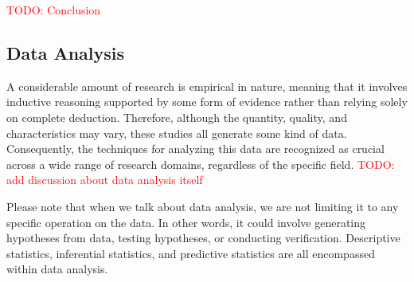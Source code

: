 \documentclass{book}
\begin{document}
\textcolor{red}{TODO: Conclusion}






\subsection{Data Analysis}
A considerable amount of research is empirical in nature, meaning that it involves inductive reasoning supported by some form of evidence rather than relying solely on complete deduction. Therefore, although the quantity, quality, and characteristics may vary, these studies all generate some kind of data. Consequently, the techniques for analyzing this data are recognized as crucial across a wide range of research domains, regardless of the specific field. \textcolor{red}{TODO: add discussion about data analysis itself}

Please note that when we talk about data analysis, we are not limiting it to any specific operation on the data. In other words, it could involve generating hypotheses from data, testing hypotheses, or conducting verification. Descriptive statistics, inferential statistics, and predictive statistics are all encompassed within data analysis.
\end{document}

